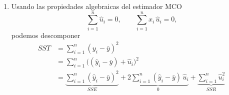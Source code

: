 \documentclass[10pt,a4paper]{article}
\begin{document}
\begin{enumerate}
{\begin{enumerate}
            \item Usando las propiedades algebraicas del estimador MCO
                $$
                    \sum_{i=1}^n
                        \hat u_i
                    =
                    0
                    ,
                    \qquad
                    \sum_{i=1}^n
                        x_{i}
                        \,
                        \hat u_i
                    =
                    0
                    \text{,}
                $$
                podemos descomponer
                \begin{align*}
                    SST
                    &=
                    \sum_{i=1}^n
                        \left(
                            y_i
                            -
                            \bar
                            y
                        \right)
                        ^
                        2
                    \\[2ex]
                    &=
                    \sum_{i=1}^n
                        \Big(
                            \left(
                                \hat y_i
                                -
                                \bar y
                            \right)
                            +
                            \hat u_i
                        \Big)
                        ^
                        2
                    \\[2ex]
                    &=
                    \underbrace{
                        \sum_{i=1}^n
                            \left(
                                \hat y_i
                                -
                                \bar y
                            \right)
                            ^
                            2
                    }_{SSE}
                    +
                    \underbrace{
                        2
                        \sum_{i=1}^n
                            \left(
                                \hat y_i
                                -
                                \bar y
                            \right)
                            \,
                            \hat u_i
                    }_{0}
                    +
                    \underbrace{
                        \sum_{i=1}^n
                            \hat u_i
                            ^
                            2
                    }_{SSR}

\end{align*}
\end{enumerate}}
\end{enumerate}
\end{document}
